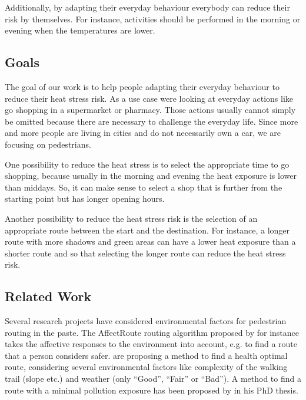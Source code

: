 Additionally, by adapting their everyday behaviour everybody can reduce their risk by themselves. For instance, activities should be performed in the morning or evening when the temperatures are lower.

\subsection{Goals}

The goal of our work is to help people adapting their everyday behaviour to reduce their heat stress risk. As a use case were looking at everyday actions like go shopping in a supermarket or pharmacy. Those actions usually cannot simply be omitted because there are necessary to challenge the everyday life. Since more and more people are living in cities and do not necessarily own a car, we are focusing on pedestrians. 

One possibility to reduce the heat stress is to select the appropriate time to go shopping, because usually in the morning and evening the heat exposure is lower than middays. So, it can make sense to select a shop that is further from the starting point but has longer opening hours.   

Another possibility to reduce the heat stress risk is the selection of an appropriate route between the start and the destination. For instance, a longer route with more shadows and green areas can have a lower heat exposure than a shorter route and so that selecting the longer route can reduce the heat stress risk. 
   
\subsection{Related Work} 

Several research projects have considered environmental factors for pedestrian routing in the paste. The AffectRoute routing algorithm proposed by \textcite{Huang2014} for instance takes the affective responses to the environment into account, e.g. to find a route that a person considers safer.  \textcite{Sharker2012} are proposing a method to find a health optimal route, considering several environmental factors like complexity of the walking trail (slope etc.) and weather (only “Good”, “Fair” or “Bad”). A method to find a route with a minimal pollution exposure has been proposed by \textcite{Hasenfratz2015} in his PhD thesis.

